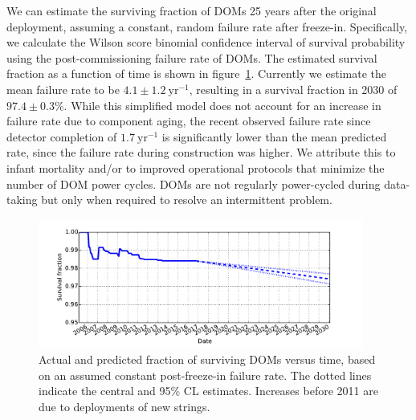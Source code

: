 We can estimate the surviving fraction of DOMs 25 years after the original
deployment, assuming a constant, random failure rate after freeze-in.
Specifically, we calculate the Wilson score binomial confidence interval \cite{Wilson_Score} of
survival probability using the post-commissioning failure rate of DOMs.
The estimated survival fraction as a function of 
time is shown in figure~\ref{fig:dom_survival}.  Currently we estimate the
mean failure rate to be $4.1\pm1.2~\mathrm{yr}^{-1}$, resulting in a
survival fraction in 2030 of $97.4\pm0.3\%$.  While this simplified 
model does not account for an increase in failure rate due to component aging, the
recent observed failure rate since detector completion of $1.7~\mathrm{yr}^{-1}$ is
significantly lower than the mean predicted rate, since the failure rate
during construction was higher.  We attribute
this to infant mortality and/or to improved operational protocols that
minimize the number of DOM power cycles.  DOMs are not regularly
power-cycled during data-taking but only when required to resolve an
intermittent problem.

\begin{figure}[!h]
 \centering
 \includegraphics[width=0.95\textwidth]{graphics/dom/reliability/dom_survival.pdf}
 \caption{Actual and predicted fraction of surviving DOMs versus time, based on an assumed
 constant post-freeze-in failure rate.  The dotted lines indicate the
 central and 95\% CL estimates.  Increases before 2011 are due
 to deployments of new strings.} 
 \label{fig:dom_survival}
\end{figure}
